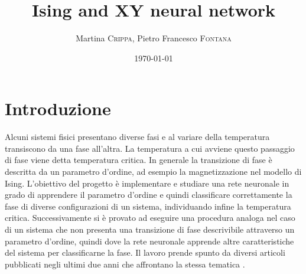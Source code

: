 \documentclass{article}
\title{Ising and XY neural network} %
\author{Martina \textsc{Crippa}, Pietro Francesco \textsc{Fontana}} %
\date{\today} %
\begin{document}
\maketitle %




\section{Introduzione}
Alcuni sistemi fisici presentano diverse fasi e al variare della temperatura transiscono da una fase all'altra. La temperatura a cui avviene questo passaggio di fase viene detta temperatura critica. In generale la transizione di fase è descritta da un parametro d'ordine, ad esempio la magnetizzazione nel modello di Ising. L'obiettivo del progetto è implementare e studiare una rete neuronale in grado di apprendere il parametro d'ordine e quindi classificare correttamente la fase di diverse configurazioni di un sistema, individuando infine la temperatura critica. Successivamente si è provato ad eseguire una procedura analoga nel caso di un sistema che non presenta una transizione di fase descrivibile attraverso un parametro d'ordine, quindi dove la rete neuronale apprende altre caratteristiche del sistema per classificarne la fase.
Il lavoro prende spunto da diversi articoli pubblicati negli ultimi due anni che affrontano la stessa tematica \cite{carrasqu,melko,wessel}.

\end{document}
